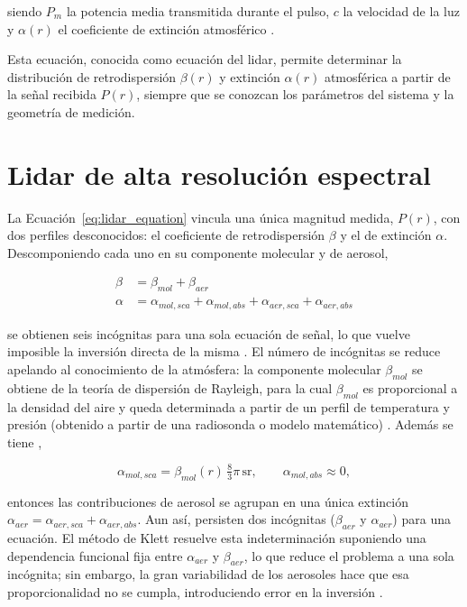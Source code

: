 \noindent siendo $P_m$ la potencia media transmitida durante el pulso, $c$ la velocidad de la luz y $\alpha(r)$ el coeficiente de extinción atmosférico \cite{weitkamp2005,kovalev2015}.

Esta ecuación, conocida como ecuación del lidar, permite determinar la distribución de retrodispersión $\beta(r)$ y extinción $\alpha(r)$ atmosférica a partir de la señal recibida $P(r)$, siempre que se conozcan los parámetros del sistema y la geometría de medición.

\section{Lidar de alta resolución espectral}
\label{sec:hsrl}

La Ecuación~\ref{eq:lidar_equation} vincula una única magnitud medida, $P(r)$, con dos perfiles desconocidos: el coeficiente de retrodispersión $\beta$ y el de extinción $\alpha$. Descomponiendo cada uno en su componente molecular y de aerosol,

\begin{align}
  \beta &= \beta_{mol} + \beta_{aer}
  \label{eq:beta_decomp} \\
  \alpha &= \alpha_{mol,sca} + \alpha_{mol,abs}
           + \alpha_{aer,sca} + \alpha_{aer,abs}
  \label{eq:alpha_decomp}
\end{align}

\noindent se obtienen seis incógnitas para una sola ecuación de señal, lo que vuelve imposible la inversión directa de la misma \cite{weitkamp2005}. El número de incógnitas se reduce apelando al conocimiento de la atmósfera: la componente molecular $\beta_{mol}$ se obtiene de la teoría de dispersión de Rayleigh, para la cual $\beta_{mol}$ es proporcional a la densidad del aire y queda determinada a partir de un perfil de temperatura y presión (obtenido a partir de una radiosonda o modelo matemático) \cite{weitkamp2005}. Además se tiene \cite{weitkamp2005},

\begin{equation}
  \alpha_{mol,sca} = \beta_{mol}(r)\,\tfrac{8}{3}\pi\,\mathrm{sr},
  \qquad \alpha_{mol,abs} \approx 0,
  \label{eq:alpha_mol_sca}
\end{equation}

\noindent entonces las contribuciones de aerosol se agrupan en una única extinción $\alpha_{aer} = \alpha_{aer,sca} + \alpha_{aer,abs}$. Aun así, persisten dos incógnitas ($\beta_{aer}$ y $\alpha_{aer}$) para una ecuación. El método de Klett resuelve esta indeterminación suponiendo una dependencia funcional fija entre $\alpha_{aer}$ y $\beta_{aer}$, lo que reduce el problema a una sola incógnita; sin embargo, la gran variabilidad de los aerosoles hace que esa proporcionalidad no se
cumpla, introduciendo error en la inversión \cite{weitkamp2005,kovalev2015}.

